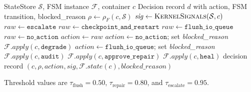 \documentclass[runningheads]{llncs}
\begin{document}
\begin{algorithm}[t]
\caption{Type~F FSM-Gated Reconciliation (single container $c$)}
\label{alg:reconcile}
\begin{algorithmic}[1]
\Require StateStore $\mathcal{S}$, FSM instance $\mathcal{F}$, container $c$
\Ensure Decision record $d$ with action, FSM transition, blocked\_reason
\State $\rho \gets \rho_F(c, \mathcal{S})$ 
\State $\mathit{sig} \gets \textsc{KernelSignals}(\mathcal{S}, c)$
  \State $\mathit{raw} \gets \texttt{escalate}$
  \State $\mathit{raw} \gets \texttt{checkpoint\_and\_restart}$
  \State $\mathit{raw} \gets \texttt{flush\_io\_queue}$
\Else
  \State $\mathit{raw} \gets \texttt{no\_action}$
\EndIf
\State $\mathit{action} \gets \mathit{raw}$
 
  \State $\mathit{action} \gets \texttt{no\_action}$; set \textit{blocked\_reason}
\EndIf
{} 
    \State $\mathcal{F}.\mathit{apply}(c, \texttt{degrade})$
  \EndIf
\EndIf
{}
  \State $\mathit{action} \gets \texttt{flush\_io\_queue}$; set \textit{blocked\_reason} 
\EndIf
{}
  \State $\mathcal{F}.\mathit{apply}(c, \texttt{audit})$ 
\EndIf
{}
  \State $\mathcal{F}.\mathit{apply}(c, \texttt{approve\_repair})$ 
\EndIf
{}
  \State $\mathcal{F}.\mathit{apply}(c, \texttt{heal})$ 
\EndIf
\State \Return decision record $(c, \rho, \mathit{action}, \mathit{sig},
  \mathcal{F}.\mathit{state}(c), \mathit{blocked\_reason})$
\end{algorithmic}
\end{algorithm}

Threshold values are $\tau_{\mathrm{flush}} = 0.50$,
$\tau_{\mathrm{repair}} = 0.80$, and $\tau_{\mathrm{escalate}} = 0.95$.
\end{document}
